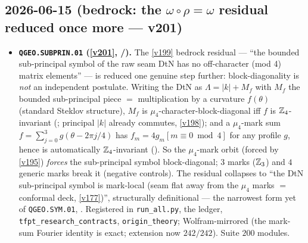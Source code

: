 \subsection*{2026-06-15 (bedrock: the $\omega\circ\rho=\omega$ residual reduced once more --- v201)}
\begin{itemize}
\item \textbf{\texttt{QGEO.SUBPRIN.01} (\vref{v201}, \mE/\mO).} The \vref{v199} bedrock residual --- ``the
  bounded sub-principal symbol of the raw seam DtN has no off-character (mod 4) matrix elements'' --- is
  reduced one genuine step further: block-diagonality is \emph{not} an independent postulate. Writing the
  DtN as $\Lambda=|k|+M_f$ with $M_f$ the bounded sub-principal piece $=$ multiplication by a curvature
  $f(\theta)$ (standard Steklov structure), $M_f$ is $\mu_4$-character-block-diagonal iff $f$ is
  $\mathbb{Z}_4$-invariant (\mE; principal $|k|$ already commutes, \vref{v198}); and a $\mu_4$-mark sum
  $f=\sum_{j=0}^3 g(\theta-2\pi j/4)$ has $f_m=4g_m[m\equiv0\bmod4]$ for any profile $g$, hence is
  automatically $\mathbb{Z}_4$-invariant (\mE). So the $\mu_4$-mark orbit (forced by \vref{v195}) \emph{forces} the
  sub-principal symbol block-diagonal; $3$ marks ($\mathbb{Z}_3$) and $4$ generic marks break it (negative
  controls). The residual collapses to ``the DtN sub-principal symbol is mark-local (seam flat away from the
  $\mu_4$ marks $=$ conformal deck, \vref{v177})'', structurally definitional --- the narrowest form yet of
  \texttt{QGEO.SYM.01}, \mO. Registered in \texttt{run\_all.py}, the ledger, \texttt{tfpt\_research\_contracts},
  \texttt{origin\_theory}; Wolfram-mirrored (the mark-sum Fourier identity is exact; extension now
  $242/242$). Suite $200$ modules.
\end{itemize}

